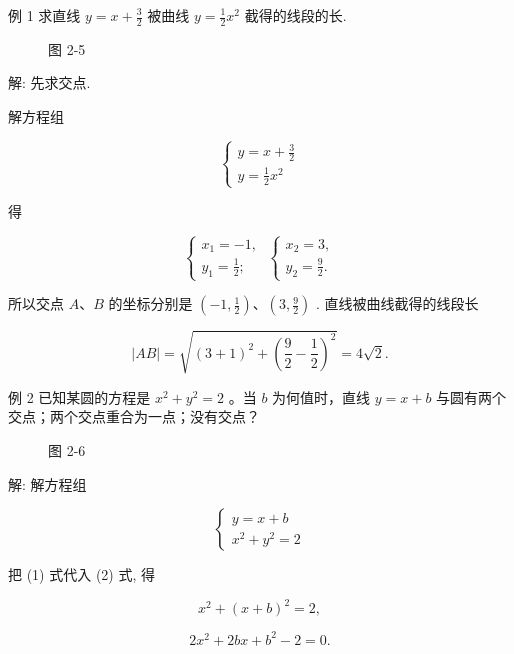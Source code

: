 \documentclass[lang=cn,newtx,12pt,scheme=chinese]{elegantbook}
\begin{document}
例 1 求直线 \(y = x + \frac{3}{2}\) 被曲线 \(y = \frac{1}{2}{x}^{2}\) 截得的线段的长.

\begin{figure}[h]
  \centering
  
  \caption{图 2-5}
\end{figure}

解: 先求交点.

解方程组

\[
  \left\{ \begin{array}{l} y = x + \frac{3}{2} \\ y = \frac{1}{2}{x}^{2} \end{array}\right.
\]

得

\[
  \left\{ {\begin{array}{l} {x}_{1} = - 1, \\ {y}_{1} = \frac{1}{2}; \end{array}\;\left\{ \begin{array}{l} {x}_{2} = 3, \\ {y}_{2} = \frac{9}{2}. \end{array}\right. }\right.
\]

所以交点 \(A\text{、}B\) 的坐标分别是 \(\left( {-1,\frac{1}{2}}\right) \text{、}\left( {3,\frac{9}{2}}\right)\) . 直线被曲线截得的线段长

\[
  \left| {AB}\right| = \sqrt{{\left( 3 + 1\right) }^{2} + {\left( \frac{9}{2} - \frac{1}{2}\right) }^{2}} = 4\sqrt{2}.
\]

例 2 已知某圆的方程是 \({x}^{2} + {y}^{2} = 2\) 。当 \(b\) 为何值时，直线 \(y = x + b\) 与圆有两个交点；两个交点重合为一点；没有交点？

\begin{figure}[h]
  \centering
  
  \caption{图 2-6}
\end{figure}

解: 解方程组

\[
  \left\{ \begin{array}{l} y = x + b \\ {x}^{2} + {y}^{2} = 2 \end{array}\right. \tag{1 2}
\]

把 (1) 式代入 (2) 式, 得

\[
    {x}^{2} + {\left( x + b\right) }^{2} = 2,
\]

\[
  2{x}^{2} + {2bx} + {b}^{2} - 2 = 0. \tag{3}
\]
\end{document}
